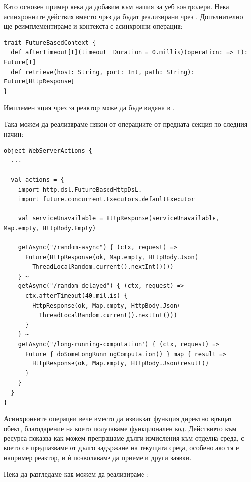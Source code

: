 Като основен пример нека да добавим  към нашия  за уеб контролери. Нека асинхронните действия вместо чрез  да бъдат реализирани чрез . Допълнително ще реимплементираме и контекста с асинхронни операции:

\begin{lstlisting}
trait FutureBasedContext {
  def afterTimeout[T](timeout: Duration = 0.millis)(operation: => T): Future[T]
  def retrieve(host: String, port: Int, path: String): Future[HttpResponse]
}
\end{lstlisting}

Имплементация чрез  за реактор може да бъде видяна в .

Така можем да реализираме някои от операциите от предната секция по следния начин:

\begin{lstlisting}
object WebServerActions {
  ...
  
  val actions = {
    import http.dsl.FutureBasedHttpDsL._
    import future.concurrent.Executors.defaultExecutor
    
    val serviceUnavailable = HttpResponse(serviceUnavailable, Map.empty, HttpBody.Empty)
    
    getAsync("/random-async") { (ctx, request) =>
      Future(HttpResponse(ok, Map.empty, HttpBody.Json(
        ThreadLocalRandom.current().nextInt())))
    } ~
    getAsync("/random-delayed") { (ctx, request) =>
      ctx.afterTimeout(40.millis) {
        HttpResponse(ok, Map.empty, HttpBody.Json(
          ThreadLocalRandom.current().nextInt()))
      }
    } ~
    getAsync("/long-running-computation") { (ctx, request) =>
      Future { doSomeLongRunningComputation() } map { result =>
        HttpResponse(ok, Map.empty, HttpBody.Json(result))
      }
    }
  }
}
\end{lstlisting}

Асинхронните операции вече вместо да извикват  функция директно връщат  обект, благодарение на което получаваме функционален код. Действието към ресурса  показва как можем препращаме дълги изчисления към отделна среда, с което се предпазваме от дълго задържане на текущата среда, особено ако тя е например реактор, и ѝ позволяваме да приеме и други заявки.

Нека да разгледаме как можем да реализираме :

